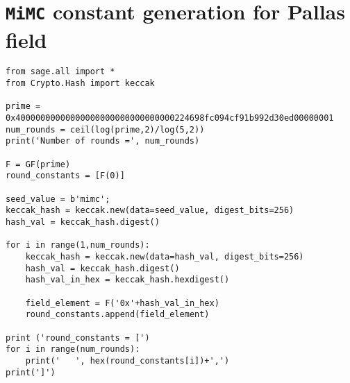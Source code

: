 \documentclass[10pt]{article}
\begin{document}
\begin{table}[t]
  \centering
  \caption{\texttt{MiMC-Feistel} hash layout}
  \label{tab:MiMCFeistelHashLayout}
\end{table}






\newpage
\appendix
\section{\texttt{MiMC} constant generation for Pallas field}%
\label{sec:mimc_constant_generation_for_pallas}
\begin{verbatim}
from sage.all import *
from Crypto.Hash import keccak

prime = 0x40000000000000000000000000000000224698fc094cf91b992d30ed00000001
num_rounds = ceil(log(prime,2)/log(5,2))
print('Number of rounds =', num_rounds)

F = GF(prime)
round_constants = [F(0)]

seed_value = b'mimc';
keccak_hash = keccak.new(data=seed_value, digest_bits=256)
hash_val = keccak_hash.digest()

for i in range(1,num_rounds):
    keccak_hash = keccak.new(data=hash_val, digest_bits=256)
    hash_val = keccak_hash.digest()
    hash_val_in_hex = keccak_hash.hexdigest()

    field_element = F('0x'+hash_val_in_hex)
    round_constants.append(field_element)

print ('round_constants = [')
for i in range(num_rounds):
    print('   ', hex(round_constants[i])+',')
print(']')
\end{verbatim}
\end{document}
